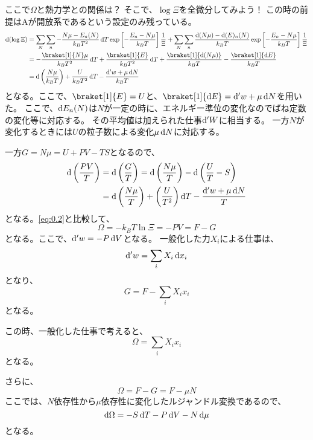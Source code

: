 \documentclass[titlepage]{ltjsarticle}
\newcommand{\ev}[1]{\braket[1]{#1}}
\begin{document}
ここで\(\Omega\)と熱力学との関係は？
そこで、\(\log \Xi\)を全微分してみよう！
この時の前提はAが開放系であるという設定のみ残っている。
\begin{align}
  \odif{(\log \Xi)} & = \sum_N \sum_n - \frac{N \mu-E_n(N)}{k_BT^2} \odif{T} \exp\left[ -\frac{E_n-N\mu}{k_BT} \right]\frac{1}{\Xi}  + \sum_N \sum_n \frac{\odif{(N\mu)}-\odif{(E)}_n(N)}{k_BT} \exp \left[ -\frac{E_n-N\mu}{k_BT} \right]\frac{1}{\Xi}\\
  & = -\frac{\ev{N}\mu}{k_BT^2} \odif{T} + \frac{\ev{E}}{k_BT^2}\odif{T} + \frac{\ev{\odif{(N\mu)}}}{k_BT} - \frac{\ev{\odif{E}}}{k_BT}\\
  & = \odif{\left( \frac{N \mu}{k_BT} \right)} + \frac{U}{k_BT^2} \odif{T} - \frac{\odif{'w}+\mu \odif{N}}{k_BT} \label{eq:0.2}
\end{align}
となる。ここで、\(\ev{E}=U\)と、\(\ev{\odif{E}}= \odif{'w}+ \mu \odif{N}\)を用いた。
ここで、\(\odif{E}_n(N)\)は\(N\)が一定の時に、エネルギー準位の変化なのでばね定数の変化等に対応する。
その平均値は加えられた仕事\(\odif{'W}\)に相当する。
一方\(N\)が変化するときには\(U\)の粒子数による変化\(\mu \odif{N}\)に対応する。

一方\(G=N\mu = U + PV - TS\)となるので、
\begin{align}
  \odif{\left( \frac{PV}{T} \right)} & = \odif{\left( \frac{G}{T} \right)} = 
  \odif{\left( \frac{N\mu}{T} \right)} - \odif{\left( \frac{U}{T} - S \right)} \\
  & = \odif{\left( \frac{N \mu}{T} \right)} + \left( \frac{U}{T^2} \right)\odif{T} - \frac{\odif{'w}+ \mu\odif{N}}{T} 
\end{align}
となる。\eqref{eq:0.2}と比較して、
\begin{equation}
  \Omega = -k_BT \ln \Xi = -PV = F-G 
\end{equation}
となる。ここで、\(\odif{'w}= -P \odif{V}\)となる。
一般化した力\(X_i\)による仕事は、
\begin{equation}
  \odif{'w} = \sum_i X_i \odif{x_i}
\end{equation}
となり、
\begin{equation}
  G = F - \sum_{i} X_i x_i 
\end{equation}
となる。

この時、一般化した仕事で考えると、
\begin{equation}
  \Omega = \sum_i X_ix_i 
\end{equation}
となる。

さらに、
\begin{equation}
  \Omega = F -G = F - \mu N 
\end{equation}
ここでは、\(N\)依存性から\(\mu\)依存性に変化したルジャンドル変換であるので、
\begin{equation}
  \odif{\Omega} = -S \odif{T} - P \odif{V} - N \odif{\mu}
\end{equation}
となる。
\end{document}
